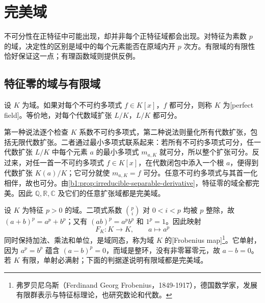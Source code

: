 
\section{完美域}
\label{b1:sec:1603}


%
%

不可分性在正特征中可能出现，却并非每个正特征域都会出现。对特征为素数 \(p\) 的域，决定性的区别是域中的每个元素能否在原域内开 \(p\) 次方。有限域的有限性恰好保证这一点；有理函数域则提供反例。

\subsection{特征零的域与有限域}
\label{b1:subsec:1603:01}

\begin{definition}\label{b1:def:perfect-field}
	设 \(K\) 为域。如果对每个不可约多项式 \(f\in K[x]\)，\(f\) 都可分，则称 \(K\) 为[perfect field]。等价地，对每个代数域扩张 \(L/K\)，\(L/K\) 都可分。
\end{definition}
第一种说法逐个检查 \(K\) 系数不可约多项式，第二种说法则量化所有代数扩张，包括无限代数扩张。二者通过最小多项式联系起来：若所有不可约多项式可分，任一代数扩张 \(L/K\) 中每个元素 \(a\) 的最小多项式 \(m_{a,K}\) 就可分，所以整个扩张可分。反过来，对任一首一不可约多项式 \(f\in K[x]\)，在代数闭包中添入一个根 \(a\)，便得到代数扩张 \(K(a)/K\)；它可分就使 \(m_{a,K}=f\) 可分。任意不可约多项式与其首一化相伴，故也可分。由\cref{b1:prop:irreducible-separable-derivative}，特征零的域全都完美。因此 \(\mathbb Q,\mathbb R,\mathbb C\) 及它们的任意扩张域都是完美域。

\ProseParagraphBreak
设 \(K\) 为特征 \(p>0\) 的域。二项式系数 \(\binom pi\) 对 \(0<i<p\) 均被 \(p\) 整除，故 \((a+b)^p=a^p+b^p\)；又有 \((ab)^p=a^pb^p\) 和 \(1^p=1\)。因此映射
\[
	F_K:K\longrightarrow K,\qquad a\longmapsto a^p
\]
同时保持加法、乘法和单位，是域同态，称为域 \(K\) 的[Frobenius map]\footnote{弗罗贝尼乌斯（Ferdinand Georg Frobenius，1849-1917），德国数学家，发展有限群表示与特征标理论，也研究数论和代数。}。它单射，因为 \(a^p=b^p\) 蕴含 \((a-b)^p=0\)，而域是整环，没有非零幂零元，故 \(a-b=0\)。若 \(K\) 有限，单射必满射；下面的判据遂说明有限域都是完美域。

